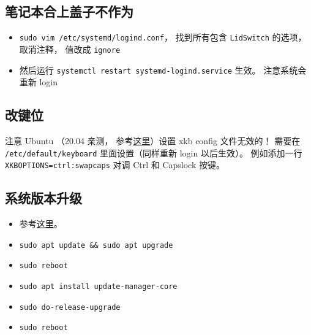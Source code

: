 

\subsection{笔记本合上盖子不作为}
\begin{itemize}
\item \verb|sudo vim /etc/systemd/logind.conf|， 找到所有包含 \verb|LidSwitch| 的选项， 取消注释， 值改成 \verb|ignore|
\item 然后运行 \verb|systemctl restart systemd-logind.service| 生效。 注意系统会重新 login
\end{itemize}

\subsection{改键位}
注意 Ubuntu （20.04 亲测， 参考\href{https://manpages.ubuntu.com/manpages/focal/en/man5/keyboard.5.html}{这里}）设置 xkb config 文件无效的！ 需要在 \verb|/etc/default/keyboard| 里面设置（同样重新 login 以后生效）。 例如添加一行 \verb|XKBOPTIONS=ctrl:swapcaps| 对调 Ctrl 和 Capslock 按键。

\subsection{系统版本升级}
\begin{itemize}
\item 参考\href{https://www.cyberciti.biz/faq/upgrade-ubuntu-18-04-to-20-04-lts-using-command-line/#Make_a_backup}{这里}。
\item \verb|sudo apt update && sudo apt upgrade|
\item \verb|sudo reboot|
\item \verb|sudo apt install update-manager-core|
\item \verb|sudo do-release-upgrade|
\item \verb|sudo reboot|
\end{itemize}
